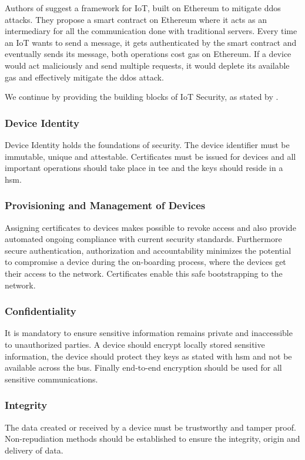 Authors of \cite{javaid2018mitigating} suggest a framework for IoT, built on Ethereum to mitigate \acrshort{ddos} attacks. They propose a smart contract on Ethereum where it acts as an intermediary for all the communication done with traditional servers. Every time an IoT wants to send a message, it gets authenticated by the smart contract and eventually sends its message, both operations cost gas on Ethereum. If a device would act maliciously and send multiple requests, it would deplete its available gas and effectively mitigate the \acrshort{ddos} attack. 

We continue by providing the building blocks of IoT Security, as stated by \cite{secure-IoT}.

\subsubsection{Device Identity}
Device Identity holds the foundations of security. The device identifier must be immutable, unique and attestable. Certificates must be issued for  devices and all important operations should take place in \acrfull{tee} and the keys should reside in a \acrfull{hsm}.

\subsubsection{Provisioning and Management of Devices}
Assigning certificates to devices makes possible to revoke access and also provide automated ongoing compliance with current security standards. Furthermore secure authentication, authorization and accountability minimizes the potential to compromise a device during the on-boarding process, where the devices get their access to the network. Certificates enable this safe bootstrapping to the network.

\subsubsection{Confidentiality}
It is mandatory to ensure sensitive information remains private and inaccessible to unauthorized parties. A device should encrypt locally stored sensitive information, the device should protect they keys as stated with \acrshort{hsm} and not be available across the bus. Finally end-to-end encryption should be used for all sensitive communications.

\subsubsection{Integrity}
The data created or received by a device must be trustworthy and tamper proof. Non-repudiation methods should be established to ensure the integrity, origin and delivery of data.


